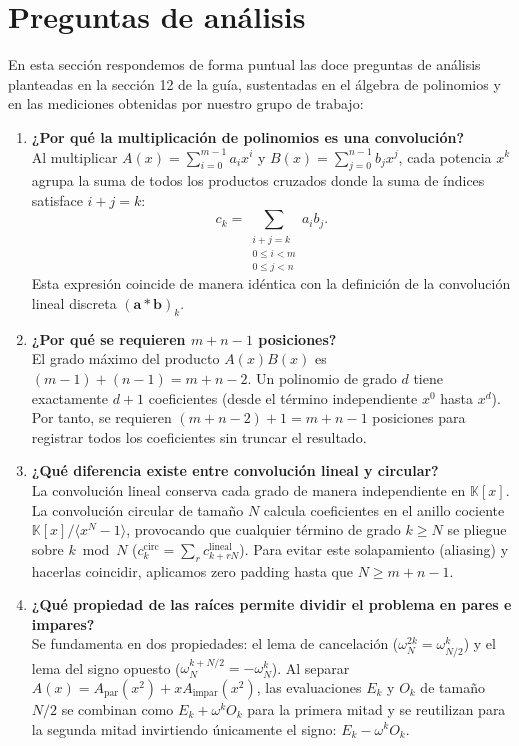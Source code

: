 \section{Preguntas de análisis}

En esta sección respondemos de forma puntual las doce preguntas de análisis planteadas en la sección 12 de la guía, sustentadas en el álgebra de polinomios y en las mediciones obtenidas por nuestro grupo de trabajo:

\begin{enumerate}
    \item \textbf{¿Por qué la multiplicación de polinomios es una convolución?}\\
    Al multiplicar $A(x) = \sum_{i=0}^{m-1} a_i x^i$ y $B(x) = \sum_{j=0}^{n-1} b_j x^j$, cada potencia $x^k$ agrupa la suma de todos los productos cruzados donde la suma de índices satisface $i+j=k$:
    \begin{equation}
    c_k = \sum_{\substack{i+j=k \\ 0 \le i < m \\ 0 \le j < n}} a_i b_j.
    \end{equation}
    Esta expresión coincide de manera idéntica con la definición de la convolución lineal discreta $(\mathbf{a} * \mathbf{b})_k$.

    \item \textbf{¿Por qué se requieren $m+n-1$ posiciones?}\\
    El grado máximo del producto $A(x)B(x)$ es $(m-1) + (n-1) = m+n-2$. Un polinomio de grado $d$ tiene exactamente $d+1$ coeficientes (desde el término independiente $x^0$ hasta $x^d$). Por tanto, se requieren $(m+n-2) + 1 = m+n-1$ posiciones para registrar todos los coeficientes sin truncar el resultado.

    \item \textbf{¿Qué diferencia existe entre convolución lineal y circular?}\\
    La convolución lineal conserva cada grado de manera independiente en $\mathbb{K}[x]$. La convolución circular de tamaño $N$ calcula coeficientes en el anillo cociente $\mathbb{K}[x] / \langle x^N - 1 \rangle$, provocando que cualquier término de grado $k \ge N$ se pliegue sobre $k \bmod N$ ($c_k^{\text{circ}} = \sum_{r} c_{k+rN}^{\text{lineal}}$). Para evitar este solapamiento (aliasing) y hacerlas coincidir, aplicamos zero padding hasta que $N \ge m+n-1$.

    \item \textbf{¿Qué propiedad de las raíces permite dividir el problema en pares e impares?}\\
    Se fundamenta en dos propiedades: el lema de cancelación ($\omega_N^{2k} = \omega_{N/2}^k$) y el lema del signo opuesto ($\omega_N^{k+N/2} = -\omega_N^k$). Al separar $A(x) = A_{\text{par}}(x^2) + x A_{\text{impar}}(x^2)$, las evaluaciones $E_k$ y $O_k$ de tamaño $N/2$ se combinan como $E_k + \omega^k O_k$ para la primera mitad y se reutilizan para la segunda mitad invirtiendo únicamente el signo: $E_k - \omega^k O_k$.


\end{enumerate}
